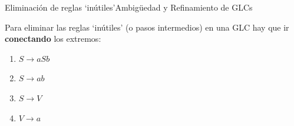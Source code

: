 \documentclass[spanish]{beamer}
\begin{document}
\begin{frame}{Eliminación de reglas `inútiles'}{Ambigüedad y Refinamiento de GLCs}

    Para eliminar las reglas `inútiles' (o pasos intermedios) en una GLC hay que ir \textbf{conectando} los extremos: \pause

    \bigskip

    \begin{enumerate}
        \item $S \to aSb$
        \item $S \to ab$
        \item \alert<3->{$S \to V$}
        \item \alert<3->{$V \to a$}
    \end{enumerate} \pause

    \bigskip



    
\end{frame}


% 
% 
\end{document}
